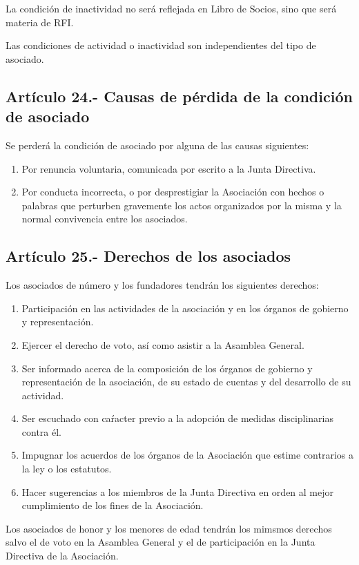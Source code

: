\documentclass[12pt]{article}
\begin{document}
La condición de inactividad no será reflejada en Libro de Socios, sino que será materia de RFI.

Las condiciones de actividad o inactividad son independientes del tipo de asociado.

\subsection{Artículo 24.- Causas de pérdida de la condición de asociado}
Se perderá la condición de asociado por alguna de las causas siguientes:
\begin{enumerate}[label=\alph*)]
    \item Por renuncia voluntaria, comunicada por escrito a la Junta Directiva.
    \item Por conducta incorrecta, o por desprestigiar la Asociación con hechos o palabras que perturben gravemente los actos organizados por la misma y la normal convivencia entre los asociados.
\end{enumerate}

\subsection{Artículo 25.- Derechos de los asociados}
Los asociados de número y los fundadores tendrán los siguientes derechos:
\begin{enumerate}[label=\alph*)]
    \item Participación en las actividades de la asociación y en los órganos de gobierno y representación.
    \item Ejercer el derecho de voto, así como asistir a la Asamblea General.
    \item Ser informado acerca de la composición de los órganos de gobierno y representación de la asociación, de su estado de cuentas y del desarrollo de su actividad.
    \item Ser escuchado con caŕacter previo a la adopción de medidas disciplinarias contra él.
    \item Impugnar los acuerdos de los órganos de la Asociación que estime contrarios a la ley o los estatutos.
    \item Hacer sugerencias a los miembros de la Junta Directiva en orden al mejor cumplimiento de los fines de la Asociación.
\end{enumerate}

Los asociados de honor y los menores de edad tendrán los mimsmos derechos salvo el de voto en la Asamblea General y el de participación en la Junta Directiva de la Asociación.
\end{document}

